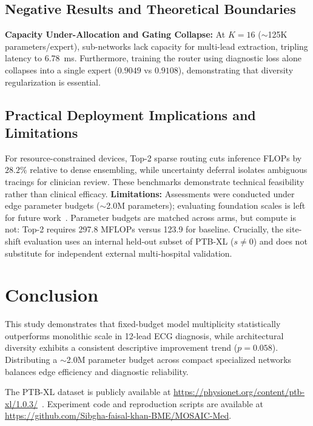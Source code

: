 \documentclass{ICIC2026}
\begin{document}
\subsection{Negative Results and Theoretical Boundaries}
\label{subsec:disc_negative}

\textbf{Capacity Under-Allocation and Gating Collapse:} At $K=16$ ($\sim$125K parameters/expert), sub-networks lack capacity for multi-lead extraction, tripling latency to 6.78~ms. Furthermore, training the router using diagnostic loss alone collapses into a single expert ($0.9049$ vs $0.9108$), demonstrating that diversity regularization is essential.

\subsection{Practical Deployment Implications and Limitations}
\label{subsec:disc_translation_limitations}

For resource-constrained devices, Top-2 sparse routing cuts inference FLOPs by $28.2\%$ relative to dense ensembling, while uncertainty deferral isolates ambiguous tracings for clinician review. These benchmarks demonstrate technical feasibility rather than clinical efficacy. \textbf{Limitations:} Assessments were conducted under edge parameter budgets ($\sim$2.0M parameters); evaluating foundation scales is left for future work~\cite{li2024ecgfounder, xu2026ecgmoe}. Parameter budgets are matched across arms, but compute is not: Top-2 requires 297.8 MFLOPs versus 123.9 for baseline. Crucially, the site-shift evaluation uses an internal held-out subset of PTB-XL ($s \ne 0$) and does not substitute for independent external multi-hospital validation.

\section{Conclusion}
\label{sec:conclusion}

This study demonstrates that fixed-budget model multiplicity statistically outperforms monolithic scale in 12-lead ECG diagnosis, while architectural diversity exhibits a consistent descriptive improvement trend ($p = 0.058$). Distributing a $\sim$2.0M parameter budget across compact specialized networks balances edge efficiency and diagnostic reliability.

The PTB-XL dataset is publicly available at \url{https://physionet.org/content/ptb-xl/1.0.3/}~\cite{wagner2020ptbxl}. Experiment code and reproduction scripts are available at \url{https://github.com/Sibgha-faisal-khan-BME/MOSAIC-Med}.

{\scriptsize


}
\end{document}

